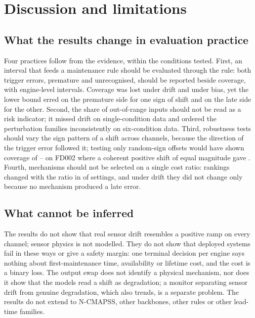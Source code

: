 \section{Discussion and limitations}
\subsection{What the results change in evaluation practice}
Four practices follow from the evidence, within the conditions tested. First, an interval that feeds a maintenance rule should be evaluated through the rule: both trigger errors, premature and unrecognised, should be reported beside coverage, with engine-level intervals. Coverage was lost under drift and under bias, yet the lower bound erred on the premature side for one sign of shift and on the late side for the other. Second, the share of out-of-range inputs should not be read as a risk indicator; it missed drift on single-condition data and ordered the perturbation families inconsistently on six-condition data. Third, robustness tests should vary the sign pattern of a shift across channels, because the direction of the trigger error followed it; testing only random-sign offsets would have shown coverage of \NBiasEqT--\NBiasEqL{} on FD002 where a coherent positive shift of equal magnitude gave \JCohPosPICPFDtwo. Fourth, mechanisms should not be selected on a single cost ratio: rankings changed with the ratio in \JRevTotal{} of \JRevGroups{} settings, and under drift they did not change only because no mechanism produced a late error.

\subsection{What cannot be inferred}
The results do not show that real sensor drift resembles a positive ramp on every channel; sensor physics is not modelled. They do not show that deployed systems fail in these ways or give a safety margin: one terminal decision per engine says nothing about first-maintenance time, availability or lifetime cost, and the cost is a binary loss. The output swap does not identify a physical mechanism, nor does it show that the models read a shift as degradation; a monitor separating sensor drift from genuine degradation, which also trends, is a separate problem. The results do not extend to N-CMAPSS, other backbones, other rules or other lead-time families.

